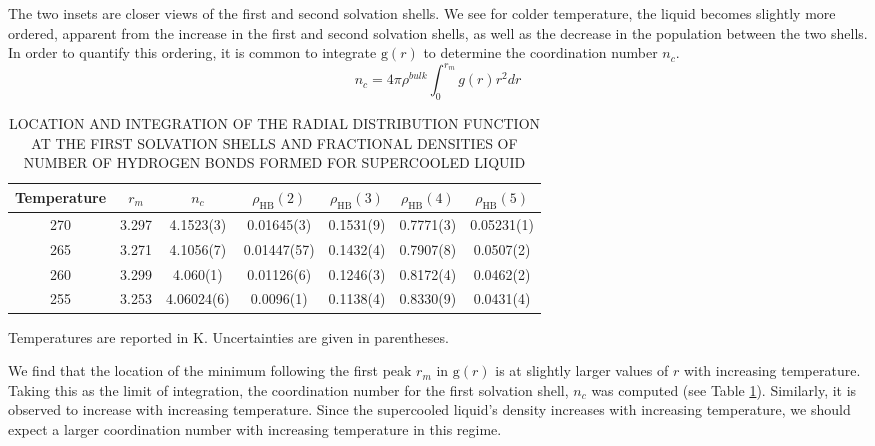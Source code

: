 The two insets are closer views of the first and second solvation
shells. We see for colder temperature, the liquid becomes slightly
more ordered, apparent from the increase in the first and second
solvation shells, as well as the decrease in the population between
the two shells. In order to quantify this ordering, it is
common to integrate $\mathrm{g}(r)$ to determine the
coordination number $n_c$.
\begin{equation}\label{eq:nofr}
n_c = 4 \pi \rho^{bulk} \int_0^{r_m} g(r)r^2dr
\end{equation}


\begin{table}[h] \centering \caption{LOCATION AND INTEGRATION OF THE
    RADIAL DISTRIBUTION FUNCTION AT THE FIRST SOLVATION SHELLS AND
    FRACTIONAL DENSITIES OF NUMBER OF HYDROGEN BONDS FORMED FOR
    SUPERCOOLED LIQUID\label{tab:gofr}}
\begin{tabular}{ccccccc}
  \hline
  \hline
  Temperature & $r_m$ & $n_c$ & $\rho_\mathrm{HB}(2)$ & $\rho_\mathrm{HB}(3)$ & $\rho_\mathrm{HB}(4)$ & $\rho_\mathrm{HB}(5)$ \\
  \hline
  270 & 3.297 &4.1523(3) & 0.01645(3) & 0.1531(9) & 0.7771(3) & 0.05231(1)\\
  265 & 3.271 & 4.1056(7) & 0.01447(57) & 0.1432(4) & 0.7907(8) & 0.0507(2)\\
  260 & 3.299 & 4.060(1) & 0.01126(6) & 0.1246(3) & 0.8172(4) & 0.0462(2)\\
  255 & 3.253 & 4.06024(6)  & 0.0096(1) & 0.1138(4) & 0.8330(9) &
                                                                  0.0431(4) \\
  \hline
  \hline
\end{tabular}
\begin{flushleft}
Temperatures are reported in K. Uncertainties are given in parentheses.
\end{flushleft}
\end{table}

We find that the location of the minimum following the first peak
$r_m$ in $\mathrm{g}(r)$ is at slightly larger values of $r$ with
increasing temperature. Taking this as the limit of integration, the
coordination number for the first solvation shell, $n_c$ was computed
(see Table \ref{tab:gofr}). Similarly, it is observed to increase with
increasing temperature. Since the supercooled liquid's density
increases with increasing temperature, we should expect a larger
coordination number with increasing temperature in this regime.

